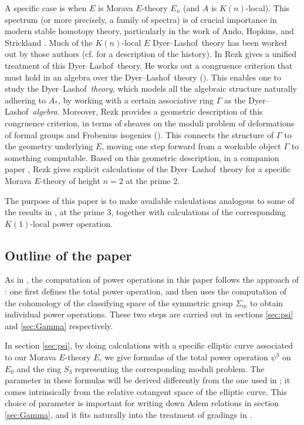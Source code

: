 \documentclass{gtpart}
\theoremstyle{definition}
\theoremstyle{remark}
\newcommand{\cff}[2]{cf.\thinspace{\cite[#1]{#2}}}
\newcommand{\DL}{Dyer--Lashof~}
\newcommand{\p}{\psi^3}
\newcommand{\G}{\Gamma}
\begin{document}
A specific case is when $E$ is Morava $E$-theory $E_n$ (and $A$ is $K(n)$-local).  
This spectrum (or more precisely, a family of spectra) is of crucial importance in modern stable homotopy theory, 
particularly in the work of Ando, Hopkins, and Strickland \cite{cube}.  
Much of the $K(n)$-local $E$ \DL theory has been worked out by those authors (\cff{1.5}{cong} for a description of the history).  
In \cite{cong} Rezk gives a unified treatment of this \DL theory.  
He works out a congruence criterion that must hold in an algebra over the \DL theory (\cite[theorem A]{cong}).  
This enables one to study the \DL {\em theory}, which models all the algebraic structure naturally adhering to $A_*$, 
by working with a certain associative ring $\G$ as the \DL {\em algebra}.  
Moreover, Rezk provides a geometric description of this congruence criterion, 
in terms of sheaves on the moduli problem of deformations of formal groups and Frobenius isogenies (\cite[theorem B]{cong}).  
This connects the structure of $\G$ to the geometry underlying $E$, 
moving one step forward from a workable object $\G$ to something computable.  
Based on this geometric description, in a companion paper \cite{h2p2}, 
Rezk gives explicit calculations of the \DL theory for a specific Morava $E$-theory of height $n = 2$ at the prime 2.  

The purpose of this paper is to make available calculations analogous to some of the results in \cite{h2p2}, at the prime 3, 
together with calculations of the corresponding $K(1)$-local power operation.  


\subsection*{Outline of the paper}

As in \cite{h2p2}, the computation of power operations in this paper follows the approach of \cite{steenrod}: 
one first defines the total power operation, 
and then uses the computation of the cohomology of the classifying space of the symmetric group $\Sigma_m$ to obtain individual power operations.  
These two steps are carried out in sections \ref{sec:psi} and \ref{sec:Gamma} respectively.  

In section \ref{sec:psi}, by doing calculations with a specific elliptic curve associated to our Morava $E$-theory $E$, 
we give formulas of the total power operation $\p$ on $E_0$ and the ring $S_3$ representing the corresponding moduli problem.  
The parameter in these formulas will be derived differently from the one used in \cite{h2p2}; 
it comes intrinsically from the relative cotangent space of the elliptic curve.  
This choice of parameter is important for writing down Adem relations in section \ref{sec:Gamma}, 
and it fits naturally into the treatment of gradings in \cite{cong}.  
\end{document}
